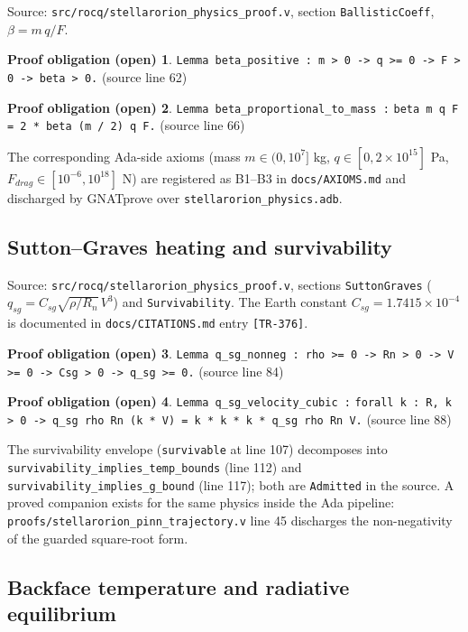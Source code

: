 \documentclass[11pt]{article}
\theoremstyle{definition}
\newtheorem*{obligation}{Proof obligation (open)}
\begin{document}
Source: \texttt{src/rocq/stellarorion\_physics\_proof.v}, section
\texttt{BallisticCoeff}, $\beta = m\,q/F$.

\begin{obligation}
\texttt{Lemma beta\_positive : m > 0 -> q >= 0 -> F > 0 -> beta > 0.}
(source line 62)
\end{obligation}

\begin{obligation}
\texttt{Lemma beta\_proportional\_to\_mass :}
\texttt{beta m q F = 2 * beta (m / 2) q F.} (source line 66)
\end{obligation}

The corresponding Ada-side axioms (mass $m \in (0, 10^7]$ kg,
$q \in [0, 2{\times}10^{15}]$ Pa, $F_{drag} \in [10^{-6}, 10^{18}]$ N) are
registered as B1--B3 in \texttt{docs/AXIOMS.md} and discharged by GNATprove
over \texttt{stellarorion\_physics.adb}.

\subsection{Sutton--Graves heating and survivability}\label{sec:sg}

Source: \texttt{src/rocq/stellarorion\_physics\_proof.v}, sections
\texttt{SuttonGraves} ($q_{sg} = C_{sg}\sqrt{\rho/R_n}\,V^3$) and
\texttt{Survivability}. The Earth constant $C_{sg} = 1.7415{\times}10^{-4}$
is documented in \texttt{docs/CITATIONS.md} entry \texttt{[TR-376]}.

\begin{obligation}
\texttt{Lemma q\_sg\_nonneg : rho >= 0 -> Rn > 0 -> V >= 0 -> Csg > 0 -> q\_sg >= 0.}
(source line 84)
\end{obligation}

\begin{obligation}
\texttt{Lemma q\_sg\_velocity\_cubic :}
\texttt{forall k : R, k > 0 -> q\_sg rho Rn (k * V) = k * k * k * q\_sg rho Rn V.}
(source line 88)
\end{obligation}

The survivability envelope (\texttt{survivable} at line 107) decomposes
into \texttt{survivability\_implies\_temp\_bounds} (line 112) and
\texttt{survivability\_implies\_g\_bound} (line 117); both are
\texttt{Admitted} in the source. A proved companion exists for the same
physics inside the Ada pipeline: \texttt{proofs/stellarorion\_pinn\_trajectory.v}
line 45 discharges the non-negativity of the guarded square-root form.

\subsection{Backface temperature and radiative equilibrium}\label{sec:thermal}
\end{document}
